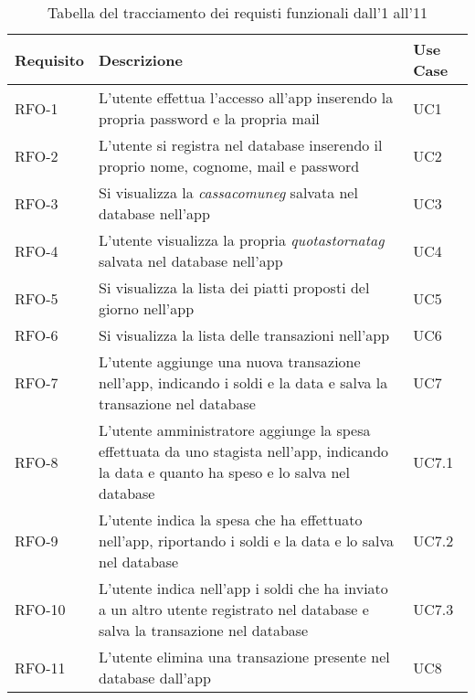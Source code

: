 \begin{table}[htb]%
\caption{Tabella del tracciamento dei requisti funzionali dall'1 all'11}
\label{tab:requisiti-funzionali}
\begin{tabularx}{\textwidth}{lXl}
\hline
\textbf{Requisito} & \textbf{Descrizione} & \textbf{Use Case}\\
\hline\hline
RFO-1     & L'utente effettua l'accesso all'app inserendo la propria password e la propria mail & UC1 \\
\hline
RFO-2     & L'utente si registra nel database inserendo il proprio nome, cognome, mail e password & UC2 \\
\hline
RFO-3     & Si visualizza la \emph{\gls{cassacomuneg}} salvata nel database nell'app & UC3 \\
\hline
RFO-4     & L'utente visualizza la propria \emph{\gls{quotastornatag}} salvata nel database nell'app & UC4 \\
\hline
RFO-5     & Si visualizza la lista dei piatti proposti del giorno nell'app & UC5 \\
\hline
RFO-6     & Si visualizza la lista delle transazioni nell'app & UC6 \\
\hline
RFO-7     & L'utente aggiunge una nuova transazione nell'app, indicando i soldi e la data e salva la transazione nel database & UC7 \\
\hline
RFO-8     & L'utente amministratore aggiunge la spesa effettuata da uno stagista nell'app, indicando la data e quanto ha speso e lo salva nel database & UC7.1 \\
\hline
RFO-9     & L'utente indica la spesa che ha effettuato nell'app, riportando i soldi e la data e lo salva nel database & UC7.2 \\
\hline
RFO-10    & L'utente indica nell'app i soldi che ha inviato a un altro utente registrato nel database e salva la transazione nel database & UC7.3 \\
\hline
RFO-11    & L'utente elimina una transazione presente nel database dall'app & UC8 \\
\hline
\end{tabularx}
\end{table}%

